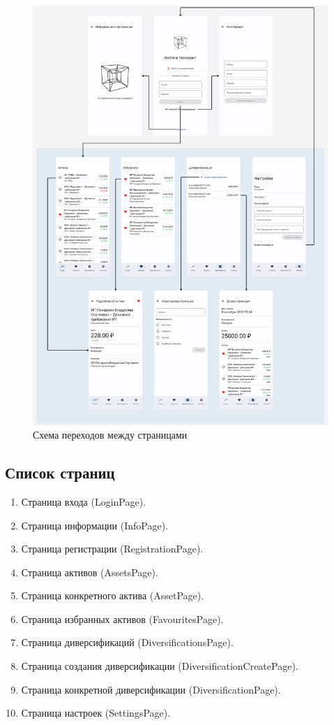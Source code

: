 \documentclass[a4paper, 14pt]{article}
\begin{document}
\begin{figure}[H]
    \centering
    \includegraphics[width=17cm]{resources/3.png}
    \caption{Схема переходов между страницами}
\end{figure}

\subsection{Список страниц}

\begin{enumerate}
    \item Страница входа (LoginPage).
    \item Страница информации (InfoPage).
    \item Страница регистрации (RegistrationPage).
    \item Страница активов (AssetsPage).
    \item Страница конкретного актива (AssetPage).
    \item Страница избранных активов (FavouritesPage).
    \item Страница диверсификаций (DiversificationsPage).
    \item Страница создания диверсификации (DiversificationCreatePage).
    \item Страница конкретной диверсификации (DiversificationPage).
    \item Страница настроек (SettingsPage).
\end{enumerate}
\end{document}

